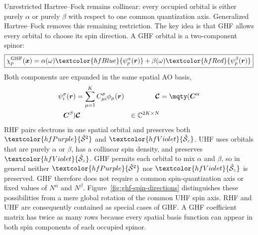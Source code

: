\documentclass[11pt,a4paper,titlepage]{article}
\numberwithin{equation}{section}
\newcommand{\br}{\boldsymbol{r}}
\newcommand{\bx}{\boldsymbol{x}}
\newcommand{\bC}{\boldsymbol{C}}
\newcommand{\chS}{\Hat{\mathcal{S}}}
\newcommand{\purple}[1]{\textcolor{hfPurple}{#1}}
\newcommand{\red}[1]{\textcolor{hfRed}{#1}}
\newcommand{\blue}[1]{\textcolor{hfBlue}{#1}}
\newcommand{\violet}[1]{\textcolor{hfViolet}{#1}}
\begin{document}
Unrestricted Hartree--Fock remains collinear: every occupied orbital is either
purely $\alpha$ or purely $\beta$ with respect to one common quantization
axis. Generalized Hartree--Fock removes this remaining restriction. The key
idea is that GHF allows every orbital to choose its spin direction.
A GHF orbital is a two-component spinor:
\begin{equation}
  \boxed{
    \chi_p^\text{GHF}(\bx)
    =\alpha(\omega)\blue{\psi_p^\alpha(\br)}
    +\beta(\omega)\red{\psi_p^\beta(\br)}
  }
\end{equation}
Both components are expanded in the same spatial AO basis,
\begin{align}
  \psi_i^\sigma(\br)&=\sum_{\mu=1}^{K}C_{\mu i}^\sigma\phi_\mu(\br)
  &
  \boldsymbol{\mathcal C}&=\mqty(\bC^\alpha\\\bC^\beta)
  &
  \boldsymbol{\mathcal C}&\in\mathbb C^{2K\times N}
\end{align}
RHF pairs electrons in one spatial orbital and preserves both
$\purple{\chS^2}$ and $\violet{\chS_z}$. UHF uses orbitals that are purely
$\alpha$ or $\beta$, has a collinear spin density, and preserves
$\violet{\chS_z}$. GHF permits each orbital to mix $\alpha$ and $\beta$, so
in general neither $\purple{\chS^2}$ nor $\violet{\chS_z}$ is preserved.
GHF therefore does not require a common spin-quantization axis or fixed values
of $N^\alpha$ and $N^\beta$.
Figure~\ref{fig:ghf-spin-directions} distinguishes these possibilities from
a mere global rotation of the common UHF spin axis.
RHF and UHF are consequently contained as special cases of GHF. A GHF
coefficient matrix has twice as many rows because every spatial basis function
can appear in both spin components of each occupied spinor.
\end{document}
